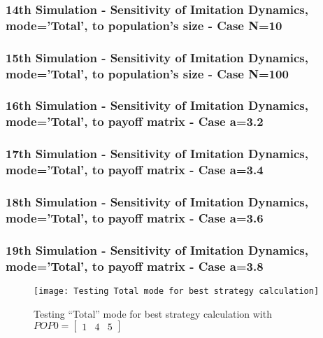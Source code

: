 \subsubsection{14th Simulation - Sensitivity of Imitation Dynamics, mode='Total', to population's size - Case N=10}

\subsubsection{15th Simulation - Sensitivity of Imitation Dynamics, mode='Total', to population's size - Case N=100}

\subsubsection{16th Simulation - Sensitivity of Imitation Dynamics, mode='Total', to payoff matrix - Case a=3.2}

\subsubsection{17th Simulation - Sensitivity of Imitation Dynamics, mode='Total', to payoff matrix - Case a=3.4}

\subsubsection{18th Simulation - Sensitivity of Imitation Dynamics, mode='Total', to payoff matrix - Case a=3.6}

\subsubsection{19th Simulation - Sensitivity of Imitation Dynamics, mode='Total', to payoff matrix - Case a=3.8}
	\begin{figure}[h]
	      \centering
	      \texttt{[image: Testing Total mode for best strategy calculation]}
	      \caption{Testing ``Total'' mode for best strategy calculation with $POP0=\begin{bmatrix}1&4&5\end{bmatrix}$}
	      \label{fig:TourTheImiTotal}
	\end{figure}
	
